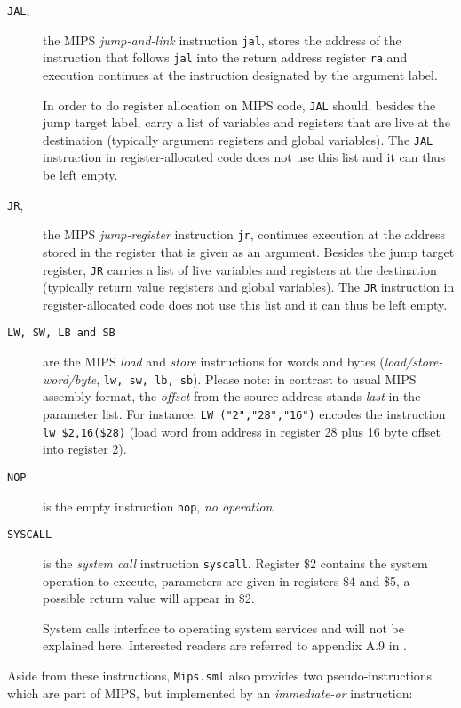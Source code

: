 \documentclass[11pt,a4paper]{article}
\newcommand{\codesize}{\scriptsize}
\newcommand{\cd}[1]{{{\codesize\tt #1}}}
\begin{document}
\begin{description}
\item[\texttt{JAL},]
	the MIPS \emph{jump-and-link} instruction \cd{jal}, stores the address
	of the instruction that follows \cd{jal} into the return address register \cd{ra}
	and execution continues at the instruction designated by the argument label.

    In order to do register allocation on MIPS code, \cd{JAL} should, besides the jump
	target label, carry a list of variables and registers that are live at the destination
	(typically argument registers and global variables).
    The \cd{JAL} instruction in register-allocated code does not use this list and it 
    can thus be left empty.
    

\item[{\tt JR},] the MIPS \emph{jump-register} instruction {\tt jr}, continues
	execution at the address stored in the register that is given as an argument.
%
	Besides the jump target register, \cd{JR} carries a list of live variables and 
	registers at the destination (typically return value registers and global variables).
    The \cd{JR} instruction in register-allocated code does not use this list and it 
    can thus be left empty.

\item[{\tt LW, SW, LB {\rm and} SB}] are the MIPS \emph{load} and \emph{store} instructions
	for words and bytes (\emph{load/store-word/byte}, \cd{lw, sw, lb, sb}).
	Please note: in contrast to usual MIPS assembly format, the \emph{offset} from
	the source address stands \emph{last} in the parameter list. For instance, 
	\cd{LW~("2","28","16")} encodes the instruction \cd{lw~\$2,16(\$28)} (load word 
	from address in register 28 plus 16 byte offset into register 2).

\item[{\tt NOP}] is the empty instruction \cd{nop}, \emph{no operation}.

\item[{\tt SYSCALL}] is the \emph{system call} instruction \cd{syscall}.
	Register \$2 contains the system operation to execute, parameters are given
	in registers \$4 and \$5, a possible return value will appear in \$2.

	System calls interface to operating system services and will not be 
	explained here. Interested readers are referred to appendix A.9 in
	\cite{PattersonHennessy}.

\end{description}

\noindent
Aside from these instructions, \cd{Mips.sml} also provides two pseudo-instructions
which are part of MIPS, but implemented by an \emph{immediate-or} instruction:
\end{document}
